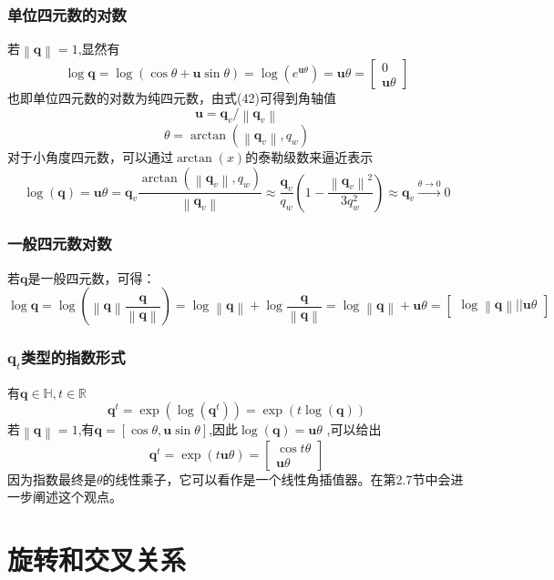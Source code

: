 \documentclass{article}
\begin{document}
\subsubsection{单位四元数的对数}
若$\left\|\textbf{q}\right\|=1$,显然有
$$
\log\textbf{q} = \log(\cos\theta+\textbf{u}\sin\theta) = 
\log(e^{\textbf{u}\theta}) = \textbf{u}\theta = \begin{bmatrix}
    0\\\textbf{u}\theta
\end{bmatrix}\label{47}
$$也即单位四元数的对数为纯四元数，由式(42)可得到角轴值
$$
    \textbf{u} = \textbf{q}_v/\left\|\textbf{q}_v\right\| 
    \label{48}
$$$$   
\theta = \arctan(\left\|\textbf{q}_v\right\|,q_w)
    \label{49}
$$对于小角度四元数，可以通过$\arctan(x)$的泰勒级数来逼近表示
$$
\log(\textbf{q}) = \textbf{u}\theta = \textbf{q}_v
\frac{\arctan(\left\|\textbf{q}_v\right\|,q_w)}{\left\|\textbf{q}_v\right\|}\approx
\frac{\textbf{q}_v}{q_w}(1-\frac{\left\|\textbf{q}_v\right\| ^2}{3q_w^2})\approx\textbf{q}_v \overset{\theta\rightarrow 0}{\rightarrow}0
\label{50}
$$
\subsubsection{一般四元数对数}
若$\textbf{q}$是一般四元数，可得：
$$
\log\textbf{q}=\log(\left\|\textbf{q}\right\|\frac{\textbf{q}}{\left\|\textbf{q}\right\|})
 = \log\left\|\textbf{q}\right\|+\log\frac{\textbf{q}}{\left\|\textbf{q}\right\|}
 = \log\left\|\textbf{q}\right\| + \textbf{u}\theta
 = \begin{bmatrix}
     \log\left\|\textbf{q}\right\|
     ||\textbf{u}\theta
 \end{bmatrix}\label{51}
 $$
 \subsubsection{$\textbf{q}_t$类型的指数形式}
有$\textbf{q}\in\mathbb{H},t\in\mathbb{R}$
$$
 \textbf{q}^t = \exp(\log(\textbf{q}^t))
  = \exp(t\log(\textbf{q}))\label{52}
$$若$\left\|\textbf{q}\right\|=1$,有$\textbf{q}=\left[\cos\theta,\textbf{u}\sin\theta\right]$,因此$\log(\textbf{q})=\textbf{u}\theta$
,可以给出
$$
\textbf{q}^t = \exp(t\textbf{u}\theta) = \begin{bmatrix}
    \cos t\theta\\ \textbf{u}\theta
\end{bmatrix}\label{53}
$$因为指数最终是$\theta$的线性乘子，它可以看作是一个线性角插值器。在第2.7节中会进一步阐述这个观点。

\section{旋转和交叉关系}
\end{document}

